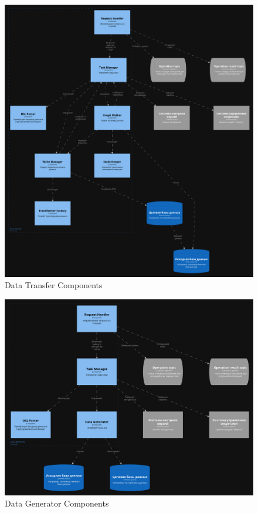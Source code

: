 \begin{figure}
  \includegraphics[scale=0.15]{./img/structurizr-DataTransferComponents.png}
  \caption{Data Transfer Components}
  \label{data-transfer-components}
\end{figure}

\begin{figure}
  \includegraphics[scale=0.15]{./img/structurizr-DataGeneratorComponents.png}
  \caption{Data Generator Components}
  \label{data-generator-components}
\end{figure}
